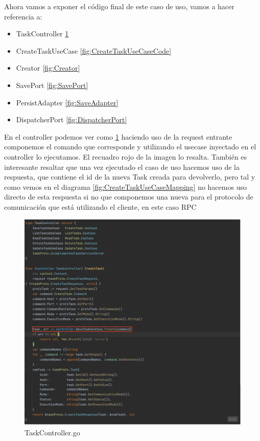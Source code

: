 Ahora vamos a exponer el código final de este caso de uso, vamos a hacer referencia a:
\begin{itemize}
    \item TaskController \ref{fig:TaskControler}
    \item CreateTaskUseCase \ref{fig:CreateTaskUseCaseCode}
    \item Creator \ref{fig:Creator}
    \item SavePort \ref{fig:SavePort}
    \item PersistAdapter \ref{fig:SaveAdapter}
    \item DispatcherPort \ref{fig:DispatcherPort}
\end{itemize}

En el controller podemos ver como \ref{fig:TaskControler} haciendo uso de la request entrante componemos el comando que corresponde y utilizando el usecase inyectado en el controller lo ejecutamos. El recuadro rojo de la imagen lo resalta. También es interesante resaltar que una vez ejecutado el caso de uso hacemos uso de la respuesta, que contiene el id de la nueva Task creada para devolverlo, pero tal y como vemos en el diagrama \ref{fig:CreateTaskUseCaseMapping} no hacemos uso directo de esta respuesta si no que componemos una nueva para el protocolo de comunicación que está utilizando el cliente, en este caso RPC

\begin{figure}[H]
    \centering
    \includegraphics[height=0.5\textheight]{./part/Ejecucion/Seguimiento/CreateTaskUseCase/img/PFM - TaskController}
    \caption{TaskController.go}\label{fig:TaskControler}
\end{figure}

